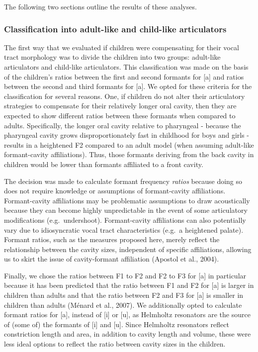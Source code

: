 \documentclass[
]{article}
\begin{document}
The following two sections outline the results of these analyses.

\hypertarget{classification-into-adult-like-and-child-like-articulators}{%
\subsubsection{Classification into adult-like and child-like articulators}\label{classification-into-adult-like-and-child-like-articulators}}

The first way that we evaluated if children were compensating for their vocal tract morphology was to divide the children into two groups: adult-like articulators and child-like articulators. This classification was made on the basis of the children's ratios between the first and second formants for {[}a{]} and ratios between the second and third formants for {[}a{]}. We opted for these criteria for the classification for several reasons. One, if children do not alter their articulatory strategies to compensate for their relatively longer oral cavity, then they are expected to show different ratios between these formants when compared to adults. Specifically, the longer oral cavity relative to pharyngeal - because the pharyngeal cavity grows disproportionately fast in childhood for boys and girls - results in a heightened F2 compared to an adult model (when assuming adult-like formant-cavity affiliations). Thus, those formants deriving from the back cavity in children would be lower than formants affiliated to a front cavity.

The decision was made to calculate formant frequency \emph{ratios} because doing so does not require knowledge or assumptions of formant-cavity affiliations. Formant-cavity affiliations may be problematic assumptions to draw acoustically because they can become highly unpredictable in the event of some articulatory modifications (e.g.~undershoot). Formant-cavity affiliations can also potentially vary due to idiosyncratic vocal tract characteristics (e.g.~a heightened palate). Formant ratios, such as the measures proposed here, merely reflect the relationship between the cavity sizes, independent of specific affiliations, allowing us to skirt the issue of cavity-formant affiliation (Apostol et al., 2004).

Finally, we chose the ratios between F1 to F2 and F2 to F3 for {[}a{]} in particular because it has been predicted that the ratio between F1 and F2 for {[}a{]} is larger in children than adults and that the ratio between F2 and F3 for {[}a{]} is smaller in children than adults (Ménard et al., 2007). We additionally opted to calculate formant ratios for {[}a{]}, instead of {[}i{]} or {[}u{]}, as Helmholtz resonators are the source of (some of) the formants of {[}i{]} and {[}u{]}. Since Helmholtz resonators reflect constriction length and area, in addition to cavity length and volume, these were less ideal options to reflect the ratio between cavity sizes in the children.
\end{document}

